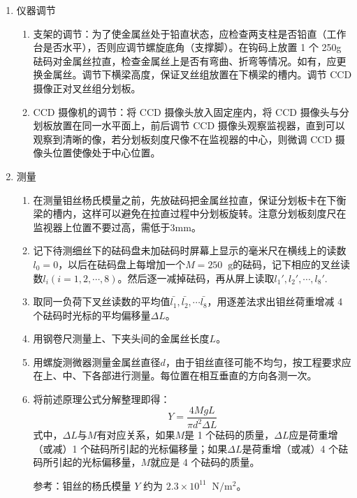 \documentclass[11pt]{article}
\newcommand*{\unit}[1]{\mathop{}\!\mathrm{#1}}
\begin{document}
\begin{enumerate}
    \item 仪器调节
    \begin{enumerate}
        \item 支架的调节：为了使金属丝处于铅直状态，应检查两支柱是否铅直（工作台是否水平），否则应调节螺旋底角（支撑脚）。在钩码上放置 1 个 250g 砝码对金属丝拉直，检查金属丝上是否有弯曲、折弯等情况。如有，应更换金属丝。调节下横梁高度，保证叉丝组放置在下横梁的槽内。调节 CCD 摄像正对叉丝组分划板。
        \item CCD 摄像机的调节：将 CCD 摄像头放入固定座内，将 CCD 摄像头与分划板放置在同一水平面上，前后调节 CCD 摄像头观察监视器，直到可以观察到清晰的像，若分划板刻度尺像不在监视器的中心，则微调 CCD 摄像头位置使像处于中心位置。
    \end{enumerate}

    \item 测量
    \begin{enumerate}
        \item 在测量钼丝杨氏模量之前，先放砝码把金属丝拉直，保证分划板卡在下衡梁的槽内，这样可以避免在拉直过程中分划板旋转。注意分划板刻度尺在监视器上位置不要过高，需低于3mm。
        \item 记下待测细丝下的砝码盘未加砝码时屏幕上显示的毫米尺在横线上的读数$l_0=0$，以后在砝码盘上每增加一个$M=250 \unit{g}$的砝码，记下相应的叉丝读数$l_i (i=1,2, \cdots ,8)$。然后逐一减掉砝码，再从屏上读取$l_1',l_2', \cdots ,l_8'$.
        \item 取同一负荷下叉丝读数的平均值$\bar{l_1},\bar{l_2}, \cdots \bar{l_8}$，用逐差法求出钼丝荷重增减 4 个砝码时光标的平均偏移量$\Delta L$。
        \item 用钢卷尺测量上、下夹头间的金属丝长度$L$。
        \item 用螺旋测微器测量金属丝直径$d$，由于钼丝直径可能不均匀，按工程要求应在上、中、下各部进行测量。每位置在相互垂直的方向各测一次。
        \item 将前述原理公式分解整理即得：
        \begin{equation}
            Y = \frac{4MgL}{\pi d^2 \Delta L}
        \end{equation}
        式中，$\Delta L$与$M$有对应关系，如果$M$是 1 个砝码的质量，$\Delta L$应是荷重增（或减）1 个砝码所引起的光标偏移量；如果$\Delta L$是荷重增（或减）4 个砝码所引起的光标偏移量，$M$就应是 4 个砝码的质量。
        
        参考：钼丝的杨氏模量 $Y$ 约为 $2.3 \times 10^{11} \unit{N/m^2}$。
    \end{enumerate}
\end{enumerate}
\end{document}
